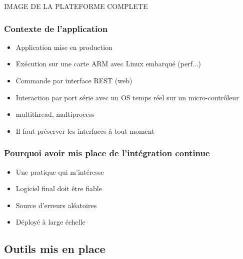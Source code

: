 \documentclass[9pt]{beamer}
\newcommand{\tocsubsection}{
  \begin{frame}
    \tableofcontents[
      currentsubsection,
      sectionstyle=show/shaded,
      subsectionstyle=show/shaded,
      subsubsectionstyle=show/show/shaded
    ]
  \end{frame}
}
\begin{document}
\begin{frame}{\subsubsecname} %

  IMAGE DE LA PLATEFORME COMPLETE

\end{frame}

\subsubsection{Contexte de l'application}
\begin{frame}{\subsubsecname} %
  \begin{itemize}
    \item Application mise en production
    \item Exécution sur une carte ARM avec Linux embarqué (perf...)
    \item Commande par interface REST (web)
    \item Interaction par port série avec un OS temps réel sur un micro-contrôleur
    \item multithread, multiprocess
    \item Il faut préserver les interfaces à tout moment
  \end{itemize}
\end{frame}


\subsubsection{Pourquoi avoir mis place de l'intégration continue}
\begin{frame}{\subsubsecname} %
  \begin{itemize}
    \item Une pratique qui m'intéresse
    \item Logiciel final doit être fiable
    \item Source d'erreurs aléatoires
    \item Déployé à large échelle
  \end{itemize}
\end{frame}



\subsection{Outils mis en place}
\tocsubsection
\end{document}
